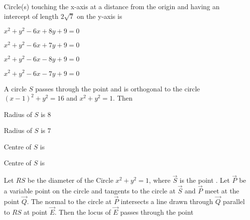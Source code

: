 \iffalse
\title{Assignment 1}
\author{EE24Btech11024 - G.Abhimanyu Koushik}
\section{mcq-multiple}
\fi
\item Circle(s) touching the x-axis at a distance  from the origin and having an intercept of length $2\sqrt{7}$ on the y-axis is 

\hfill{}
\begin{enumerate}
\begin{multicols}{2}
\item $x^2 + y^2 - 6x + 8y + 9 = 0$
\item $x^2 + y^2 - 6x + 7y + 9 = 0$
\item $x^2 + y^2 - 6x - 8y + 9 = 0$
\item $x^2 + y^2 - 6x - 7y + 9 = 0$
\end{multicols}
\end{enumerate}
\item A circle $S$ passes through the point  and is orthogonal to the circle $(x-1)^2+y^2=16$ and $x^2+y^2=1$. Then

\hfill {}
\begin{enumerate}
\begin{multicols}{2}
\item Radius of $S$ is $8$
\item Radius of $S$ is $7$
\item Centre of $S$ is 
\item Centre of $S$ is 
\end{multicols}
\end{enumerate}
\item Let $RS$ be the diameter of the Circle $x^{2} + y^{2} = 1$, where $\vec{S}$ is the point . Let $\vec{P}$ be a variable point  on the circle and tangents to the circle at $\vec{S}$ and $\vec{P}$ meet at the point $\vec{Q}$. The normal to the circle at $\vec{P}$ intersects a line drawn through $\vec{Q}$ parallel to $RS$ at point $\vec{E}$. Then the locus of $\vec{E}$ passes through the point

